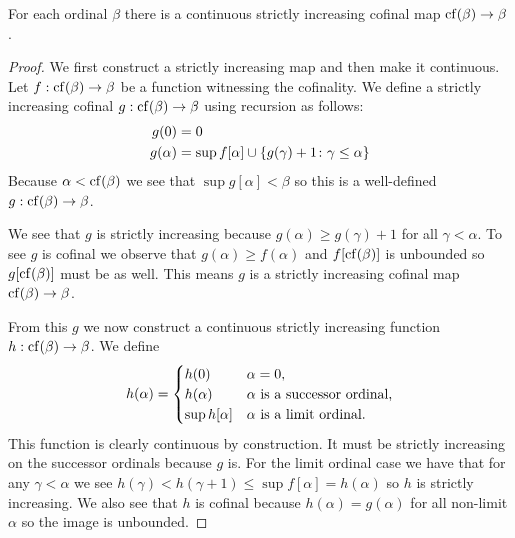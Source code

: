 \begin{proposition}
    For each ordinal \(\beta\) there is a continuous strictly increasing cofinal
    map \(\operatorname{cf}(\beta)\to\beta\).

    \begin{proof}
        We first construct a strictly increasing map and then make it
        continuous. Let \(f:\operatorname{cf}(\beta)\to\beta\) be a function witnessing the
        cofinality. We define a strictly increasing cofinal
        \(g:\operatorname{cf}(\beta)\to\beta\) using recursion as follows:
        \begin{align*}
            g(0)      & =0                                                         \\
            g(\alpha) & =\sup f[\alpha]\cup\left\{g(\gamma)+1\colon\gamma\leq\alpha\right\} \\
        \end{align*}
        Because \(\alpha<\operatorname{cf}(\beta)\) we see that \(\sup g[\alpha]<\beta\) so
        this is a well-defined \(g:\operatorname{cf}(\beta)\to\beta\).

        We see that \(g\) is strictly increasing because \(g(\alpha)\geq
        g(\gamma)+1\) for all \(\gamma<\alpha\). To see \(g\) is cofinal we
        observe that \(g(\alpha)\geq f(\alpha)\) and \(f[\operatorname{cf}(\beta)]\) is
        unbounded so \(g[\operatorname{cf}(\beta)]\) must be as well. This means \(g\) is a
        strictly increasing cofinal map \(\operatorname{cf}(\beta)\to\beta\).

        From this \(g\) we now construct a continuous strictly increasing
        function \(h:\operatorname{cf}(\beta)\to\beta\). We define
        \[
            h(\alpha)=\begin{cases}
                h(0)           & \alpha=0,                                       \\
                h(\alpha)      & \textnormal{\(\alpha\) is a successor ordinal,} \\
                \sup h[\alpha] & \textnormal{\(\alpha\) is a limit ordinal.}
            \end{cases}
        \]
        This function is clearly continuous by construction. It must be strictly
        increasing on the successor ordinals because \(g\) is. For the limit
        ordinal case we have that for any \(\gamma<\alpha\) we see
        \(h(\gamma)<h(\gamma+1)\leq\sup f[\alpha]=h(\alpha)\) so \(h\) is
        strictly increasing. We also see that \(h\) is cofinal because
        \(h(\alpha)=g(\alpha)\) for all non-limit \(\alpha\) so the image is
        unbounded.
    \end{proof}
\end{proposition}

